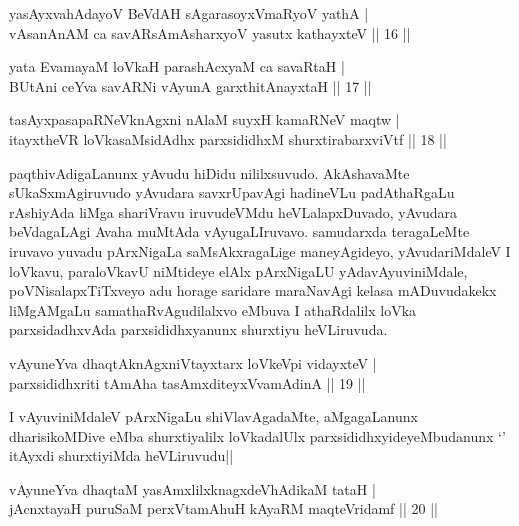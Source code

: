 \begin{shl}
yasAyx\s \s vahAdayoV BeVdAH sAgarasoyxVmaRyoV yathA |\\
vAsanAnAM ca savARsAmAsharxyoV yasutx kathayxteV \hfill || 16 ||
\end{shl}

\begin{shl}
yata EvamayaM loVkaH parashAcxyaM ca savaRtaH |\\
BUtAni ceYva savARNi vAyunA garxthitAnayxtaH \hfill || 17 ||
\end{shl}

\begin{shl}
tasAyxpasapaRNeV\s knAgxni nAlaM suyxH kamaRNeV maqtw |\\
itayxtheVR loVkasaMsidAdhx parxsididhxM shurxtirabarxviVtf \hfill || 18 ||
\end{shl}

\begin{artha}%
paqthivAdigaLanunx yAvudu hiDidu nililxsuvudo. AkAshavaMte sUkaSxmAgiruvudo yAvudara savxrUpavAgi hadineVLu padAthaRgaLu rAshiyAda liMga shariVravu iruvudeVMdu heVLalapxDuvado, yAvudara beVdagaLAgi Avaha muMtAda vAyugaLIruvavo. samudarxda teragaLeMte iruvavo yuvadu pArxNigaLa saMsAkxragaLige maneyAgideyo, yAvudariMdaleV I loVkavu, paraloVkavU niMtideye elAlx pArxNigaLU yAdavAyuviniMdale, poVNisalapxTiTxveyo adu horage saridare maraNavAgi kelasa mADuvudakekx liMgAMgaLu samathaRvAgudilalxvo eMbuva I athaRdalilx loVka parxsidadhxvAda parxsididhxyanunx shurxtiyu heVLiruvuda. 
\end{artha}

\begin{shl}
vAyuneYva dhaqtAknAgxniVtayxtarx loVkeV\s pi vidayxteV |\\
parxsididhxriti tAmAha tasAmxditeyxVvamAdinA \hfill || 19 ||
\end{shl}

\begin{artha}%
I vAyuviniMdaleV pArxNigaLu shiVlavAgadaMte, aMgagaLanunx dharisikoMDive eMba shurxtiyalilx loVkadalUlx parxsididhxyideyeMbudanunx `\stext ' itAyxdi shurxtiyiMda heVLiruvudu||
\end{artha}


\begin{shl}
vAyuneYva dhaqtaM yasAmxlilxknagxdeVhAdikaM tataH |\\
jAcnxtayaH puruSaM perxVtamAhuH kAyaRM maqteVridamf \hfill || 20 ||
\end{shl}

